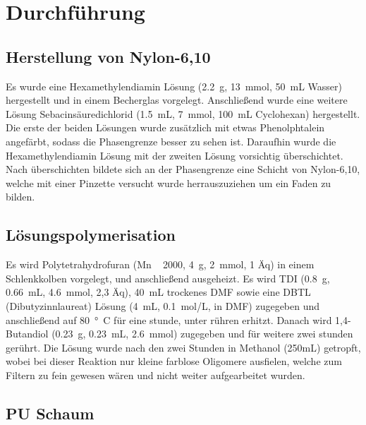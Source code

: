 \documentclass[10pt,a4paper,ngerman]{scrartcl}
\begin{document}
\section{Durchführung}

	\subsection{Herstellung von Nylon-6,10}

		Es wurde eine Hexamethylendiamin Lösung (\SI{2,2}{g}, \SI{13}{mmol}, \SI{50}{mL} Wasser) hergestellt und in einem Becherglas vorgelegt.
		Anschließend wurde eine weitere Lösung Sebacinsäuredichlorid (\SI{1,5}{mL}, \SI{7}{mmol}, \SI{100}{mL} Cyclohexan) hergestellt.
		Die erste der beiden Lösungen wurde zusätzlich mit etwas Phenolphtalein angefärbt, sodass die Phasengrenze besser zu sehen ist.
		Daraufhin wurde die Hexamethylendiamin Lösung mit der zweiten Lösung vorsichtig überschichtet. 
		Nach überschichten bildete sich an der Phasengrenze eine Schicht von Nylon-6,10, welche mit einer Pinzette versucht wurde herrauszuziehen um ein Faden zu bilden.\\

		



	\subsection{Lösungspolymerisation}

		Es wird Polytetrahydrofuran (Mn ~ 2000, \SI{4}{g}, \SI{2}{mmol}, 1 Äq) in einem Schlenkkolben vorgelegt, und anschließend ausgeheizt.
		Es wird TDI (\SI{0,8}{g}, \SI{0,66}{mL}, \SI{4,6}{mmol}, 2,3 Äq), \SI{40}{mL} trockenes DMF sowie eine DBTL (Dibutyzinnlaureat) Lösung (\SI{4}{mL}, \SI{0,1}{mol/L}, in DMF) 
		zugegeben und anschließend auf \SI{80}{°C} für eine stunde, unter rühren erhitzt.
		Danach wird 1,4-Butandiol (\SI{0,23}{g}, \SI{0,23}{mL}, \SI{2,6}{mmol}) zugegeben und für weitere zwei stunden gerührt.
		Die Lösung wurde nach den zwei Stunden in Methanol (250mL) getropft, wobei bei dieser Reaktion nur kleine farblose Oligomere ausfielen, welche zum Filtern 
		zu fein gewesen wären und nicht weiter aufgearbeitet wurden.

	\subsection{PU Schaum}
\end{document}

